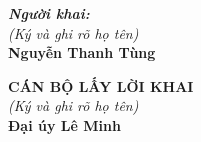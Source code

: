 \documentclass[12pt,a4paper]{article}
\begin{document}
\vspace{0.8cm}

\noindent
\begin{minipage}[t]{0.45\textwidth}
    \textbf{\textit{Người khai:}}\\
    \textit{(Ký và ghi rõ họ tên)}\\[1.5cm]
    \textbf{Nguyễn Thanh Tùng}
\end{minipage}
\hfill
\begin{minipage}[t]{0.5\textwidth}
    \begin{center}
        \textbf{CÁN BỘ LẤY LỜI KHAI}\\
        \textit{(Ký và ghi rõ họ tên)}\\[1.5cm]
        \textbf{Đại úy Lê Minh}
    \end{center}
\end{minipage}
\end{document}

